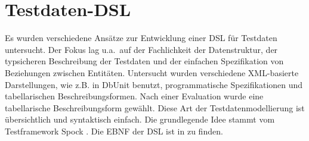 \section{Testdaten-DSL}


%
%

Es wurden verschiedene Ansätze zur Entwicklung einer DSL für Testdaten untersucht. Der Fokus lag u.a.~auf der Fachlichkeit der Datenstruktur, der typsicheren Beschreibung der Testdaten und der einfachen Spezifikation von Beziehungen zwischen Entitäten. Untersucht wurden verschiedene XML-basierte Darstellungen, wie z.B. in DbUnit benutzt, programmatische Spezifikationen und  tabellarischen Beschreibungsformen. 
%
Nach einer Evaluation wurde eine tabellarische Beschreibungsform gewählt.
%
%
Diese Art der Testdatenmodellierung ist übersichtlich und  syntaktisch einfach. Die grundlegende Idee 
%
%
stammt vom Testframework Spock \cite{Spock}.
%
Die EBNF der DSL ist in \cite{MT:Moll:2013} zu finden.



